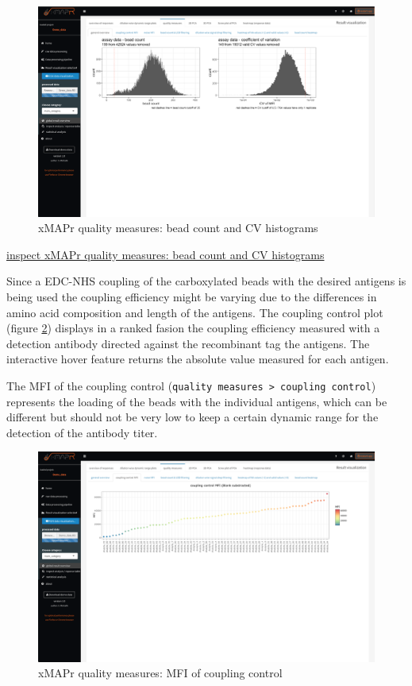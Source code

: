 \documentclass[
]{book}
\begin{document}
\begin{figure}
\includegraphics[width=50.47in]{figures/quality_measures__general_overview} \caption{xMAPr quality measures: bead count and CV histograms}\label{fig:beadCountCVhist}
\end{figure}

\href{figures/quality_measures__general_overview.png}{inspect xMAPr quality measures: bead count and CV histograms}

Since a EDC-NHS coupling of the carboxylated beads with the desired antigens is being used the coupling efficiency might be varying due to the differences in amino acid composition and length of the antigens.
The coupling control plot (figure \ref{fig:MFIcouplingControl}) displays in a ranked fasion the coupling efficiency measured with a detection antibody directed against the recombinant tag the antigens. The interactive hover feature returns the absolute value measured for each antigen.

The MFI of the coupling control (\texttt{quality\ measures\ \textgreater{}\ coupling\ control}) represents the loading of the beads with the individual antigens, which can be different but should not be very low to keep a certain dynamic range for the detection of the antibody titer.

\begin{figure}
\includegraphics[width=50.47in]{figures/quality_measures__coupling_control_MFI} \caption{xMAPr quality measures: MFI of coupling control}\label{fig:MFIcouplingControl}
\end{figure}
\end{document}
